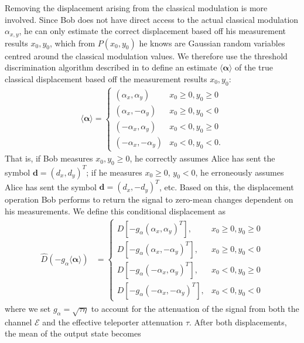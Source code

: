 \documentclass[%
 reprint,
 superscriptaddress,
 amsmath,
 amssymb,
 aps,
 pra,
]{revtex4-2}
\begin{document}
\begin{widetext}
Removing the displacement arising from the classical modulation is more involved. Since Bob does not have direct access to the actual classical modulation $\alpha_{x,y}$, he can only estimate the correct displacement based off his measurement results $x_0, y_0$, which from $P(x_0,y_0)$ he knows are Gaussian random variables centred around the classical modulation values. We therefore use the threshold discrimination algorithm described in \cite{zaunders_enhanced_2025} to define an estimate $\langle \bm \alpha \rangle$ of the true classical displacement based off the measurement results $x_0,y_0$:
\begin{align}
    \langle \bm \alpha \rangle = \begin{cases}
        (\alpha_x ,  \alpha_y) & x_0 \geq 0, y_0 \geq 0 \\
        (\alpha_x , -\alpha_y) & x_0 \geq 0, y_0 < 0 \\
        (-\alpha_x,  \alpha_y) & x_0 < 0, y_0 \geq 0 \\
        (-\alpha_x, -\alpha_y) & x_0 < 0, y_0 < 0.
    \end{cases}
\end{align}
That is, if Bob measures $x_0,y_0 \geq 0$, he correctly assumes Alice has sent the symbol $\bm d = (d_x, d_y)^T$; if he measures $x_0 \geq 0$, $y_0 < 0$, he erroneously assumes Alice has sent the symbol $\bm d = (d_x, -d_y)^T$, etc. Based on this, the displacement operation Bob performs to return the signal to zero-mean changes dependent on his measurements. We define this conditional displacement as
\begin{align}
    \hat D(-g_\alpha\langle \bm \alpha \rangle) &= \begin{cases}
        D\left[-g_\alpha(\alpha_x ,  \alpha_y)^T \right], & x_0 \geq 0, y_0 \geq 0 \\
        D\left[-g_\alpha(\alpha_x , -\alpha_y)^T \right], & x_0 \geq 0, y_0 < 0 \\
        D\left[-g_\alpha(-\alpha_x,  \alpha_y)^T \right], & x_0 < 0, y_0 \geq 0 \\
        D\left[-g_\alpha(-\alpha_x, -\alpha_y)^T \right], & x_0 < 0, y_0 < 0
    \end{cases}
\end{align}
where we set $g_\alpha = \sqrt{\tau \eta}$ to account for the attenuation of the signal from both the channel $\mathcal{E}$ and the effective teleporter attenuation $\tau$. After both displacements, the mean of the output state becomes
\begin{align}

\end{align}
\end{widetext}
\end{document}
